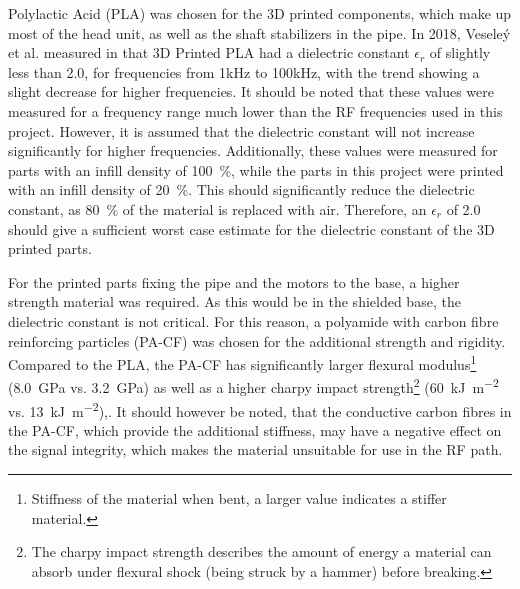 Polylactic Acid (PLA) was chosen for the 3D printed components, which make up most of the head unit, as well as the shaft stabilizers in the pipe. In 2018, Veseleý et al. measured in \cite{vesely_evaluation_2018} that 3D Printed PLA had a dielectric constant $\epsilon_r$ of slightly less than 2.0, for frequencies from 1kHz to 100kHz, with the trend showing a slight decrease for higher frequencies. It should be noted that these values were measured for a frequency range much lower than the RF frequencies used in this project. However, it is assumed that the dielectric constant will not increase significantly for higher frequencies. Additionally, these values were measured for parts with an infill density of \SI{100}{\percent}, while the parts in this project were printed with an infill density of \SI{20}{\percent}. This should significantly reduce the dielectric constant, as \SI{80}{\percent} of the material is replaced with air. Therefore, an $\epsilon_r$ of 2.0 should give a sufficient worst case estimate for the dielectric constant of the 3D printed parts.

For the printed parts fixing the pipe and the motors to the base, a higher strength material was required. As this would be in the shielded base, the dielectric constant is not critical. For this reason, a polyamide with carbon fibre reinforcing particles (PA-CF) was chosen for the additional strength and rigidity. Compared to the PLA, the PA-CF has significantly larger flexural modulus\footnote{Stiffness of the material when bent, a larger value indicates a stiffer material.} (\SI{8.0}{\giga\pascal} vs. \SI{3.2}{\giga\pascal}) as well as a higher charpy impact strength\footnote{The charpy impact strength describes the amount of energy a material can absorb under flexural shock (being struck by a hammer) before breaking.} (\SI{60}{\kilo\joule\per\square\metre} vs. \SI{13}{\kilo\joule\per\square\metre})\cite{formfutura_bv_technical_2023},\cite{prusa_polymers_technical_2022}. It should however be noted, that the conductive carbon fibres in the PA-CF, which provide the additional stiffness, may have a negative effect on the signal integrity, which makes the material unsuitable for use in the RF path.

